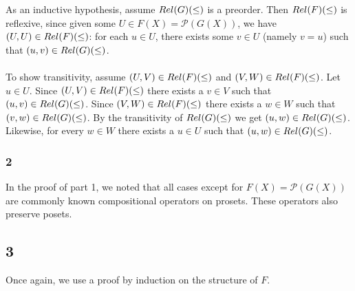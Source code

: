\documentclass{article}
\begin{document}
\begin{description}
As an inductive hypothesis, assume $\mit{Rel}(G)(\leq)$ is a preorder.
Then $\mit{Rel}(F)(\leq)$ is reflexive, since given some $U \in F(X) = \mathcal P(G(X))$, we have $(U,U) \in \mit{Rel}(F)(\leq)$:
for each $u \in U$, there exists some $v \in U$ (namely $v = u$) such that $(u,v) \in \mit{Rel}(G)(\leq)$.\\~\\
To show transitivity, assume $(U,V) \in \mit{Rel}(F)(\leq)$ and $(V,W) \in \mit{Rel}(F)(\leq)$.
Let $u \in U$. Since $(U,V) \in \mit{Rel}(F)(\leq)$ there exists a $v \in V$ such that $(u,v) \in \mit{Rel}(G)(\leq)$. Since
$(V,W) \in \mit{Rel}(F)(\leq)$ there exists a $w \in W$ such that $(v,w) \in \mit{Rel}(G)(\leq)$. By the transitivity of
$\mit{Rel}(G)(\leq)$ we get $(u,w) \in \mit{Rel}(G)(\leq)$. Likewise, for every $w \in W$ there exists a $u \in U$ such that
$(u,w) \in \mit{Rel}(G)(\leq)$.
\end{description}

\subsubsection*{2}

In the proof of part 1, we noted that all cases except for $F(X) = \mathcal P(G(X))$ are commonly known 
compositional operators on prosets. These operators also preserve posets. 

\subsection*{3}

Once again, we use a proof by induction on the structure of $F$.
\end{document}
